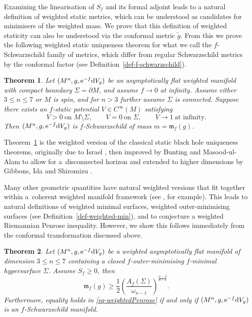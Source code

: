 \documentclass[pdftex]{sigma}
\numberwithin{equation}{section}
\newtheorem{Theorem}{Theorem}[section]
\theoremstyle{definition}
\begin{document}
Examining the linearisation of $S_f$ and its formal adjoint leads to a natural definition of weighted static metrics, which can be understood as candidates for minimisers of the weighted mass. We prove that this definition of weighted staticity can also be understood via the conformal metric $\widetilde g$. From this we prove the following weighted static uniqueness theorem for what we call the $f$-Schwarzschild family of metrics, which differ from regular Schwarzschild metrics by the conformal factor  (see Definition~\ref{def-f-schwarzschild}).
\begin{Theorem}\label{thm-fstatic-bh-rigidity-intro}
	Let $(M^n,g,{\rm e}^{-f}{\rm d}V_g)$ be an asymptotically flat weighted manifold with compact boundary
	$\Sigma=\partial M$, and assume $f\to 0$ at infinity.
	Assume either $3\le n\le 7$ or $M$ is spin, and for $n>3$ further assume $\Sigma$ is connected.
Suppose there exists an $f$-static potential $V\in C^\infty(M)$ satisfying
	\[
	V>0\ \text{on }M\setminus\Sigma,\qquad V=0\ \text{on }\Sigma,\qquad V\to 1\ \text{at infinity}.
	\]
Then $(M^n,g,{\rm e}^{-f}{\rm d}V_g)$ is $f$-Schwarzschild of mass $m=\mathfrak{m}_f(g)$.
\end{Theorem}

Theorem~\ref{thm-fstatic-bh-rigidity-intro} is the weighted version of the classical static black hole uniqueness theorems, originally due to Israel \cite{israel1967event}, then improved by Bunting and Masood-ul-Alam \cite{BuntingMasoodUlAlam87} to allow for a~disconnected horizon and extended to higher dimensions by Gibbons, Ida and Shiromizu \cite{GibbonsIdaShiromizu02}.


Many other geometric quantities have natural weighted versions that fit together within a~coherent weighted manifold framework (see \cite[Table~1]{BaldaufOzuch22}, for example). This leads to natural definitions of weighted minimal surfaces, weighted outer-minimising surfaces (see Definition~\ref{def-weighted-min}), and to conjecture a weighted Riemannian Penrose inequality. However, we show this follows immediately from the conformal transformation discussed above.
\begin{Theorem}\label{thm-weightedPenrose-intro}
	Let $(M^n,g,{\rm e}^{-f}{\rm d}V_g)$ be a weighted asymptotically flat manifold of dimension $3\le n\le 7$ containing a closed $f$-outer-minimising $f$-minimal hypersurface $\Sigma$. Assume $S_f\ge 0$, then
	\begin{equation}\label{eq-weightedPenrose}
		\mathfrak{m}_f(g) \ge \frac12\left(\frac{A_f(\Sigma)}{\omega_{n-1}}\right)^{\frac{n-2}{n-1}}.
	\end{equation}
	Furthermore, equality holds in \eqref{eq-weightedPenrose} if and only if $(M^n,g,{\rm e}^{-f}{\rm d}V_g)$ is an $f$-Schwarzschild manifold.
\end{Theorem}
\end{document}
